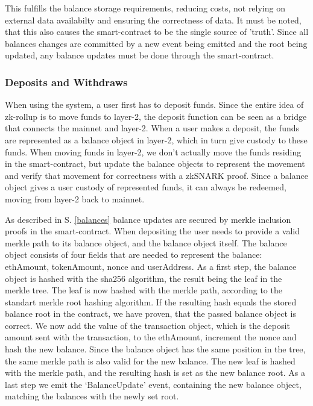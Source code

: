 \documentclass[../../thesis.tex]{subfiles}
\begin{document}
This fulfills the balance storage requirements, reducing costs, not relying on external data availabilty and ensuring the correctness of data. It must be noted, that this also causes the smart-contract to be the single source of 'truth'. Since all balances changes are committed by a new event being emitted and the root being updated, any balance updates must be done through the smart-contract.

\subsubsection{Deposits and Withdraws}
When using the system, a user first has to deposit funds. Since the entire idea of zk-rollup is to move funds to layer-2, the deposit function can be seen as a bridge that connects the mainnet and layer-2. When a user makes a deposit, the funds are represented as a balance object in layer-2, which in turn give custody to these funds. When moving funds in layer-2, we don't actually move the funds residing in the smart-contract, but update the balance objects to represent the movement and verify that movement for correctness with a zkSNARK proof. Since a balance object gives a user custody of represented funds, it can always be redeemed, moving from layer-2 back to mainnet.  

As described in S. \ref{balances} balance updates are secured by merkle inclusion proofs in the smart-contract. When depositing the user needs to provide a valid merkle path to its balance object, and the balance object itself. The balance object consists of four fields that are needed to represent the balance: ethAmount, tokenAmount, nonce and userAddress. As a first step, the balance object is hashed with the sha256 algorithm, the result being the leaf in the merkle tree. The leaf is now hashed with the merkle path, according to the standart merkle root hashing algorithm. If the resulting hash equals the stored balance root in the contract, we have proven, that the passed balance object is correct. We now add the value of the transaction object, which is the deposit amount sent with the transaction, to the ethAmount, increment the nonce and hash the new balance. Since the balance object has the same position in the tree, the same merkle path is also valid for the new balance. The new leaf is hashed with the merkle path, and the resulting hash is set as the new balance root. As a last step we emit the `BalanceUpdate' event, containing the new balance object, matching the balances with the newly set root. 
\end{document}
